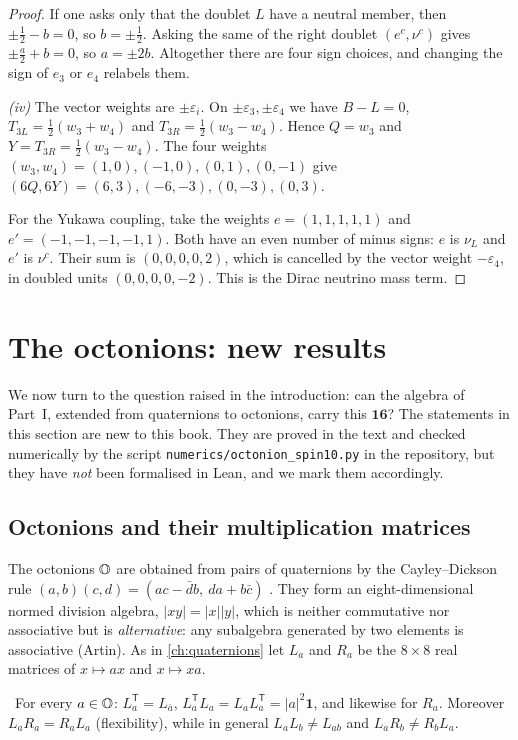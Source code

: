\begin{proof}
If one asks only that the doublet $L$ have a neutral member, then $\pm\frac12-b=0$, so $b=\pm\frac12$. Asking the same of the right doublet $(e^c,\nu^c)$ gives $\pm\frac a2+b=0$, so $a=\pm2b$. Altogether there are four sign choices, and changing the sign of $e_3$ or $e_4$ relabels them.

\emph{(iv)} The vector weights are $\pm\varepsilon_i$. On $\pm\varepsilon_3,\pm\varepsilon_4$ we have $B-L=0$, $T_{3L}=\frac12(w_3+w_4)$ and $T_{3R}=\frac12(w_3-w_4)$. Hence $Q=w_3$ and $Y=T_{3R}=\frac12(w_3-w_4)$. The four weights $(w_3,w_4)=(1,0),(-1,0),(0,1),(0,-1)$ give $(6Q,6Y)=(6,3),(-6,-3),(0,-3),(0,3)$.

For the Yukawa coupling, take the weights $e=(1,1,1,1,1)$ and $e'=(-1,-1,-1,-1,1)$. Both have an even number of minus signs: $e$ is $\nu_L$ and $e'$ is $\nu^c$. Their sum is $(0,0,0,0,2)$, which is cancelled by the vector weight $-\varepsilon_4$, in doubled units $(0,0,0,0,-2)$. This is the Dirac neutrino mass term.
\end{proof}


\section{The octonions: new results}

We now turn to the question raised in the introduction: can the algebra of Part~I, extended from quaternions to octonions, carry this $\mathbf{16}$? The statements in this section are new to this book. They are proved in the text and checked numerically by the script \texttt{numerics/octonion\_spin10.py} in the repository, but they have \emph{not} been formalised in Lean, and we mark them accordingly.

\subsection*{Octonions and their multiplication matrices}

The octonions $\mathbb{O}$ are obtained from pairs of quaternions by the Cayley--Dickson rule $(a,b)(c,d)=(ac-\bar db,\ da+b\bar c)$ \cite{Baez2002,ConwaySmith}. They form an eight-dimensional normed division algebra, $|xy|=|x||y|$, which is neither commutative nor associative but is \emph{alternative}: any subalgebra generated by two elements is associative (Artin). As in \cref{ch:quaternions} let $L_a$ and $R_a$ be the $8\times8$ real matrices of $x\mapsto ax$ and $x\mapsto xa$.

\begin{proposition}\label{prop:octmat}\txt\
For every $a\in\mathbb{O}$: $L_a^{\mathsf T}=L_{\bar a}$, $L_a^{\mathsf T}L_a=L_aL_a^{\mathsf T}=|a|^2\mathbf 1$, and likewise for $R_a$. Moreover $L_aR_a=R_aL_a$ (flexibility), while in general $L_aL_b\ne L_{ab}$ and $L_aR_b\ne R_bL_a$.
\end{proposition}

